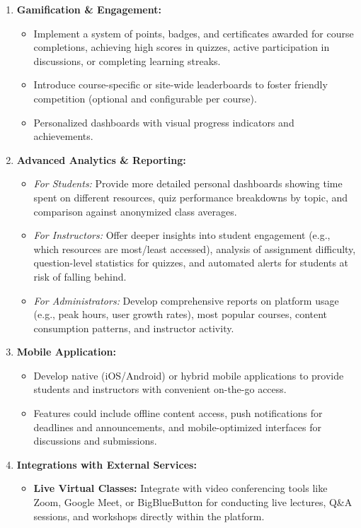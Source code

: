 \documentclass[12pt,a4paper]{article}
\begin{document}
\begin{enumerate}
    \item \textbf{Gamification \& Engagement:}
    \begin{itemize}
        \item Implement a system of points, badges, and certificates awarded for course completions, achieving high scores in quizzes, active participation in discussions, or completing learning streaks.
        \item Introduce course-specific or site-wide leaderboards to foster friendly competition (optional and configurable per course).
        \item Personalized dashboards with visual progress indicators and achievements.
    \end{itemize}
    \item \textbf{Advanced Analytics \& Reporting:}
    \begin{itemize}
        \item \textit{For Students:} Provide more detailed personal dashboards showing time spent on different resources, quiz performance breakdowns by topic, and comparison against anonymized class averages.
        \item \textit{For Instructors:} Offer deeper insights into student engagement (e.g., which resources are most/least accessed), analysis of assignment difficulty, question-level statistics for quizzes, and automated alerts for students at risk of falling behind.
        \item \textit{For Administrators:} Develop comprehensive reports on platform usage (e.g., peak hours, user growth rates), most popular courses, content consumption patterns, and instructor activity.
    \end{itemize}
    \item \textbf{Mobile Application:}
    \begin{itemize}
        \item Develop native (iOS/Android) or hybrid mobile applications to provide students and instructors with convenient on-the-go access.
        \item Features could include offline content access, push notifications for deadlines and announcements, and mobile-optimized interfaces for discussions and submissions.
    \end{itemize}
    \item \textbf{Integrations with External Services:}
    \begin{itemize}
        \item \textbf{Live Virtual Classes:} Integrate with video conferencing tools like Zoom, Google Meet, or BigBlueButton for conducting live lectures, Q\&A sessions, and workshops directly within the platform.

\end{itemize}
\end{enumerate}
\end{document}
